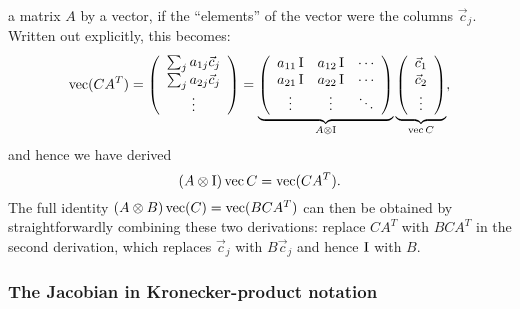 a matrix $A$ by a vector, if the ``elements'' of the vector were
the columns $\vec{c}_{j}$. Written out explicitly, this becomes:
\[
\operatorname{vec}(CA^{T})=\left(\begin{array}{c}
\sum_{j}a_{1j}\vec{c}_{j}\\
\sum_{j}a_{2j}\vec{c}_{j}\\
\vdots
\end{array}\right)=\underbrace{\left(\begin{array}{ccc}
a_{11}\operatorname{I} & a_{12}\operatorname{I} & \cdots\\
a_{21}\operatorname{I} & a_{22}\operatorname{I} & \cdots\\
\vdots & \vdots & \ddots
\end{array}\right)}_{A\otimes\operatorname{I}}\underbrace{\left(\begin{array}{c}
\vec{c}_{1}\\
\vec{c}_{2}\\
\vdots
\end{array}\right)}_{\operatorname{vec} C},
\]
and hence we have derived
\[
(A\otimes\operatorname{I})\operatorname{vec} C=\operatorname{vec}(CA^{T}).
\]
The full identity $(A\otimes B)\operatorname{vec}(C)=\operatorname{vec}(BCA^{T})$ can then
be obtained by straightforwardly combining these two derivations: replace $CA^T$ with $BCA^T$ in the second derivation, which replaces $\vec{c}_j$ with $B\vec{c}_j$ and hence $\operatorname{I}$ with $B$.

\subsubsection{The Jacobian in Kronecker-product notation}

